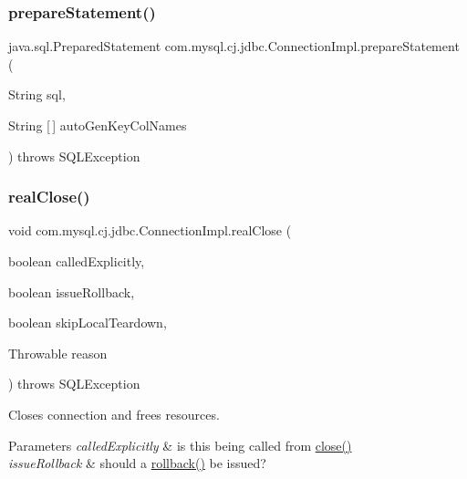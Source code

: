 \subsubsection{\texorpdfstring{prepare\+Statement()}{prepareStatement()}\hspace{0.1cm}{\footnotesize\ttfamily [6/6]}}
{\footnotesize\ttfamily java.\+sql.\+Prepared\+Statement com.\+mysql.\+cj.\+jdbc.\+Connection\+Impl.\+prepare\+Statement (\begin{DoxyParamCaption}\item[{String}]{sql,  }\item[{String \mbox{[}$\,$\mbox{]}}]{auto\+Gen\+Key\+Col\+Names }\end{DoxyParamCaption}) throws S\+Q\+L\+Exception}

\mbox{\label{classcom_1_1mysql_1_1cj_1_1jdbc_1_1_connection_impl_a8a78dfbe0aa7dd8b881a9f9716f16ed6}} 
\subsubsection{\texorpdfstring{real\+Close()}{realClose()}}
{\footnotesize\ttfamily void com.\+mysql.\+cj.\+jdbc.\+Connection\+Impl.\+real\+Close (\begin{DoxyParamCaption}\item[{boolean}]{called\+Explicitly,  }\item[{boolean}]{issue\+Rollback,  }\item[{boolean}]{skip\+Local\+Teardown,  }\item[{Throwable}]{reason }\end{DoxyParamCaption}) throws S\+Q\+L\+Exception}

Closes connection and frees resources.


\begin{DoxyParams}{Parameters}
{\em called\+Explicitly} & is this being called from \mbox{\hyperlink{classcom_1_1mysql_1_1cj_1_1jdbc_1_1_connection_impl_a9d82246a207b618a8ce3dfcf349c971d}{close()}} \\
\hline
{\em issue\+Rollback} & should a \mbox{\hyperlink{classcom_1_1mysql_1_1cj_1_1jdbc_1_1_connection_impl_adb29692483164e8c98dbeb9c6eb5a972}{rollback()}} be issued? \\
\hline
\end{DoxyParams}

